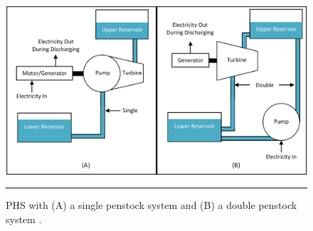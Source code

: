 \begin{figure}[htbp]
	\centering
	\includegraphics[width=\textwidth]{figures/penstock_systems.png}
	\rule{\textwidth}{0.5pt} %
	\caption{PHS with (A) a single penstock system and (B) a double penstock system \citep[p.~39]{Connolly2015}.}
	\label{fig:penstock_systems}
\end{figure}